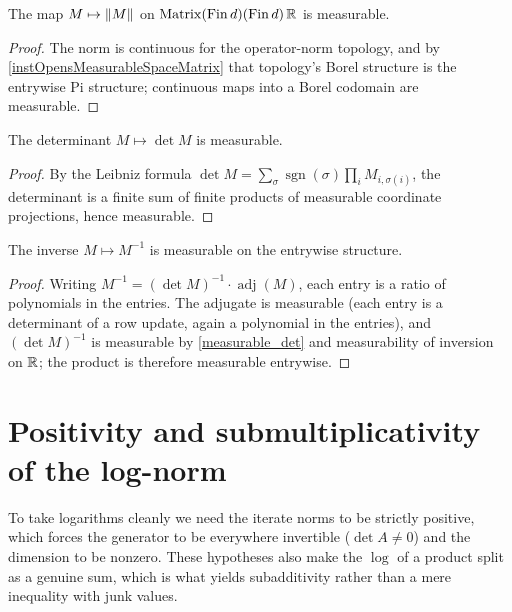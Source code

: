 \begin{theorem}\label{measurable_l2_opNorm}
  \leanok
  The map \(M \mapsto \left\lVert M \right\rVert\) on \(\operatorname{Matrix}(\operatorname{Fin} d)(\operatorname{Fin} d)\,\mathbb{R}\) is measurable.
\end{theorem}
\begin{proof}\leanok
  The norm is continuous for the operator-norm topology, and by
  \ref{instOpensMeasurableSpaceMatrix} that topology's Borel structure is the entrywise
  Pi structure; continuous maps into a Borel codomain are measurable.
\end{proof}

\begin{theorem}\label{measurable_det}
  \leanok
  The determinant \(M \mapsto \det M\) is measurable.
\end{theorem}
\begin{proof}\leanok
  By the Leibniz formula \(\det M = \sum_{\sigma}\operatorname{sgn}(\sigma)\prod_i M_{i,\sigma(i)}\),
  the determinant is a finite sum of finite products of measurable coordinate
  projections, hence measurable.
\end{proof}

\begin{theorem}\label{measurable_inv_matrix}
  \leanok
  The inverse \(M \mapsto M^{-1}\) is measurable on the entrywise structure.
\end{theorem}
\begin{proof}\leanok
  Writing \(M^{-1} = (\det M)^{-1}\cdot \operatorname{adj}(M)\), each entry is a ratio of
  polynomials in the entries. The adjugate is measurable (each entry is a determinant of a
  row update, again a polynomial in the entries), and \((\det M)^{-1}\) is measurable by
  \ref{measurable_det} and measurability of inversion on \(\mathbb{R}\); the product is therefore
  measurable entrywise.
\end{proof}

\section{Positivity and submultiplicativity of the log-norm}

To take logarithms cleanly we need the iterate norms to be strictly positive, which
forces the generator to be everywhere invertible (\(\det A \neq 0\)) and the dimension to
be nonzero. These hypotheses also make the \(\log\) of a product split as a genuine sum,
which is what yields subadditivity rather than a mere inequality with junk values.

